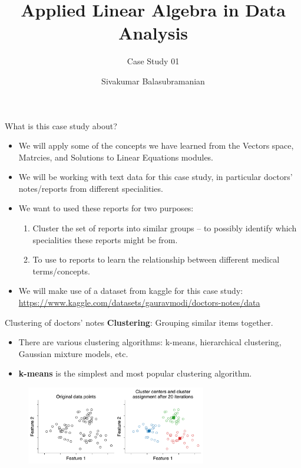 \documentclass[aspectratio=169]{beamer}
\title{Applied Linear Algebra in Data Analysis}
\subtitle{Case Study 01}
\author{Sivakumar Balasubramanian}
\institute[Christian Medical College] %
{
  \inst{}%
  Department of Bioengineering\\
  Christian Medical College, Bagayam\\
  Vellore 632002
}
\date{}
\let\olditem\item
\renewcommand{\item}{\setlength{\itemsep}{\fill}\olditem}
\begin{document}
\begin{frame}
  \titlepage
\end{frame}


\begin{frame}[t]{What is this case study about?}
\begin{itemize}
\item We will apply some of the concepts we have learned from the Vectors space, Matrcies, and Solutions to Linear Equations modules.
\item We will be working with text data for this case study, in particular doctors' notes/reports from different specialities.
\item We want to used these reports for two purposes:
\begin{enumerate}
  \item Cluster the set of reports into similar groups -- to possibly identify which specialities these reports might be from.
  \item To use to reports to learn the relationship between different medical terms/concepts.
\end{enumerate}
\item We will make use of a dataset from kaggle for this case study: \href{https://www.kaggle.com/datasets/gauravmodi/doctors-notes/data}{https://www.kaggle.com/datasets/gauravmodi/doctors-notes/data}
\end{itemize}
\end{frame}


\begin{frame}[t]{Clustering of doctors' notes}
  \textbf{Clustering}: Grouping similar items together.

  \begin{itemize}
    \item There are various clustering algorithms: k-means, hierarchical clustering, Gaussian mixture models, etc.
    \item \textbf{k-means} is the simplest and most popular clustering algorithm.
  \end{itemize}

  \begin{figure}
    \centering
    \includegraphics[width=0.7\textwidth]{kmeans-final.pdf}
  \end{figure}
\end{frame}
\end{document}
